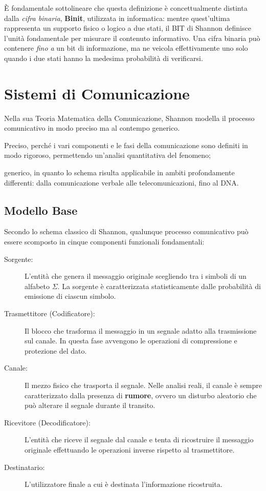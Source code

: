 È fondamentale sottolineare che questa definizione è concettualmente distinta dalla \textit{cifra binaria}, \textbf{Binit}, utilizzata in informatica: mentre quest'ultima rappresenta un supporto fisico o logico a due stati, il BIT di Shannon definisce l'unità fondamentale per misurare il contenuto informativo. Una cifra binaria può contenere \textit{fino a} un bit di informazione, ma ne veicola effettivamente uno solo quando i due stati hanno la medesima probabilità di verificarsi.

\section{Sistemi di Comunicazione}
Nella sua Teoria Matematica della Comunicazione, Shannon modella il processo comunicativo in modo preciso ma al contempo generico.

Preciso, perché i vari componenti e le fasi della comunicazione sono definiti in modo rigoroso, permettendo un'analisi quantitativa del fenomeno;

generico, in quanto lo schema risulta applicabile in ambiti profondamente differenti: dalla comunicazione verbale alle telecomunicazioni, fino al DNA.

\subsection{Modello Base}
Secondo lo schema classico di Shannon, qualunque processo comunicativo può essere scomposto in cinque componenti funzionali fondamentali:

\begin{description}
    \item[Sorgente:] L'entità che genera il messaggio originale scegliendo tra i simboli di un alfabeto $\Sigma$. La sorgente è caratterizzata statisticamente dalle probabilità di emissione di ciascun simbolo.
    
    \item[Trasmettitore (Codificatore):] Il blocco che trasforma il messaggio in un segnale adatto alla trasmissione sul canale. In questa fase avvengono le operazioni di compressione e protezione del dato.
    
    \item[Canale:] Il mezzo fisico che trasporta il segnale. Nelle analisi reali, il canale è sempre caratterizzato dalla presenza di \textbf{rumore}, ovvero un disturbo aleatorio che può alterare il segnale durante il transito.
    
    \item[Ricevitore (Decodificatore):] L'entità che riceve il segnale dal canale e tenta di ricostruire il messaggio originale effettuando le operazioni inverse rispetto al trasmettitore.
    
    \item[Destinatario:] L'utilizzatore finale a cui è destinata l'informazione ricostruita.
\end{description}

